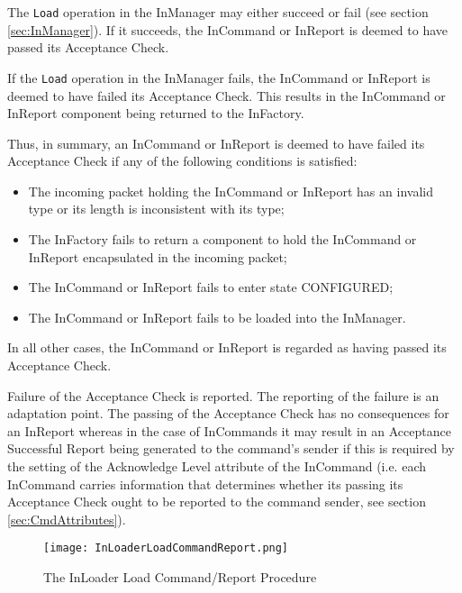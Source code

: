 The \texttt{Load} operation in the InManager may either succeed or fail (see section \ref{sec:InManager}). If it succeeds, the InCommand or InReport is deemed to have passed its Acceptance Check. 
  
If the \texttt{Load} operation in the InManager fails, the InCommand or InReport is deemed to have failed its Acceptance Check. This results in the InCommand or InReport component being returned to the InFactory.

Thus, in summary, an InCommand or InReport is deemed to have failed its Acceptance Check if any of the following conditions is satisfied:
\begin{itemize}
\item The incoming packet holding the InCommand or InReport has an invalid type or its length is inconsistent with its type;
\item The InFactory fails to return a component to hold the InCommand or InReport encapsulated in the incoming packet;
\item The InCommand or InReport fails to enter state CONFIGURED;
\item The InCommand or InReport fails to be loaded into the InManager.
\end{itemize}
In all other cases, the InCommand or InReport is regarded as having passed its Acceptance Check. 

Failure of the Acceptance Check is reported. The reporting of the failure is an adaptation point. The passing of the Acceptance Check has no consequences for an InReport whereas in the case of InCommands it may result in an Acceptance Successful Report being generated to the command's sender if this is required by the setting of the Acknowledge Level attribute of the InCommand (i.e. each InCommand carries information that determines whether its passing its Acceptance Check ought to be reported to the command sender, see section \ref{sec:CmdAttributes}). 

\begin{figure}[H]
 \centering
 \texttt{[image: InLoaderLoadCommandReport.png]}
 \caption{The InLoader Load Command/Report Procedure}
 \label{fig:InLoaderLoadCommandReport}
\end{figure}

